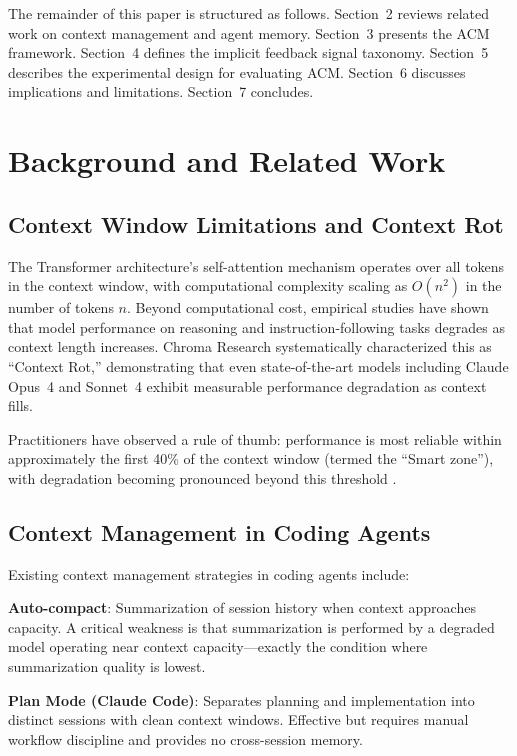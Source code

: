 \documentclass[conference]{IEEEtran}
\begin{document}
The remainder of this paper is structured as follows. Section~2 reviews related work on context management and agent memory. Section~3 presents the ACM framework. Section~4 defines the implicit feedback signal taxonomy. Section~5 describes the experimental design for evaluating ACM. Section~6 discusses implications and limitations. Section~7 concludes.

\section{Background and Related Work}

\subsection{Context Window Limitations and Context Rot}

The Transformer architecture's self-attention mechanism operates over all tokens in the context window, with computational complexity scaling as $O(n^2)$ in the number of tokens $n$. Beyond computational cost, empirical studies have shown that model performance on reasoning and instruction-following tasks degrades as context length increases. Chroma Research \cite{ChromaResearch2025} systematically characterized this as ``Context Rot,'' demonstrating that even state-of-the-art models including Claude Opus~4 and Sonnet~4 exhibit measurable performance degradation as context fills.

Practitioners have observed a rule of thumb: performance is most reliable within approximately the first 40\% of the context window (termed the ``Smart zone''), with degradation becoming pronounced beyond this threshold \cite{Huntley2025}.

\subsection{Context Management in Coding Agents}

Existing context management strategies in coding agents include:

\textbf{Auto-compact}: Summarization of session history when context approaches capacity. A critical weakness is that summarization is performed by a degraded model operating near context capacity---exactly the condition where summarization quality is lowest.

\textbf{Plan Mode (Claude Code)}: Separates planning and implementation into distinct sessions with clean context windows. Effective but requires manual workflow discipline and provides no cross-session memory.
\end{document}
